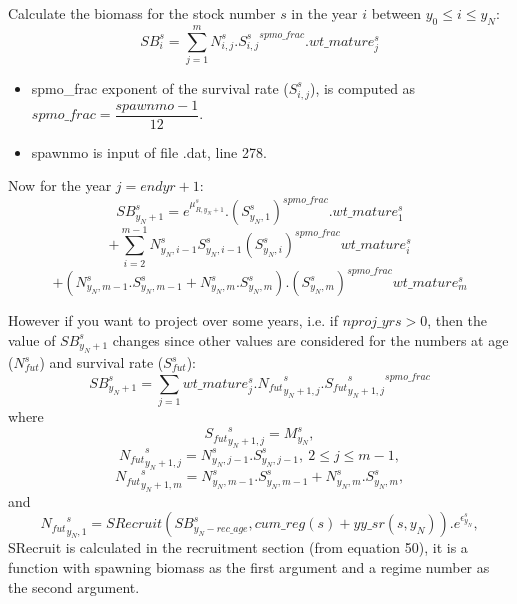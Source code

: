 \documentclass{article}
\begin{document}
Calculate the biomass for the stock number $s$ in the year $i$ between $y_0 \leq i \leq y_N$:
    \begin{equation}
    SB^s_i=\sum_{j=1}^{m}N^s_{i,j}.{S^s_{i,j}}^{spmo\_frac}.wt\_mature^s_j
\end{equation}
\begin{itemize}
    \item spmo\_frac exponent of the survival rate ($S^s_{i,j}$), is computed as 
    $spmo\_frac=\dfrac{spawnmo-1}{12}$.
    \item spawnmo is input of file .dat, line 278.
    
\end{itemize}
Now for the year $j=endyr+1$:
\begin{equation}
    SB^s_{y_N+1}=e^{\mu^s_{R,y_N+1}}.(S^{s}_{y_N,1})^{spmo\_frac
    }.wt\_mature^s_1
\end{equation}
\begin{equation*}
+\sum_{i=2}^{m-1}N^{s}_{y_N,i-1}S^{s}_{y_N,i-1}(S^s_{y_N,i})^{spmo\_frac}wt\_mature^s_i
\end{equation*}
\begin{equation*}
    +(N^{s}_{y_N,m-1}.S^s_{y_N,m-1}+N^s_{y_N,m}.S^s_{y_N,m}).(S^s_{y_N,m})^{spmo\_frac}wt\_mature^s_{m}
\end{equation*}

However if you want to project over some years, i.e. if $nproj\_yrs>0$, then the value of $SB^s_{y_N+1}$ changes since other values are considered for the numbers at age ($N^s_{fut}$) and survival rate ($S^s_{fut}$):
\begin{equation}
    SB^s_{y_N+1}= \sum_{j=1}wt\_mature^s_j.{N_{fut}}^s_{y_N+1,j}.{{S_{fut}}^s_{y_N+1,j}}^{spmo\_frac}
\end{equation}
where 
\begin{equation}
    {S_{fut}}^s_{y_N+1,j}=M^s_{y_N},
\end{equation}
\begin{equation}
    {N_{fut}}^s_{y_N+1,j}=N^s_{y_N,j-1}.S^s_{y_N,j-1}, \ 2\leq j \leq m-1,
\end{equation}
\begin{equation}
    {N_{fut}}^s_{y_N+1,m}=N^s_{y_N,m-1}.S^s_{y_N,m-1}+N^s_{y_N,m}.S^s_{y_N,m},
\end{equation}
and 
\begin{equation}
    {N_{fut}}^s_{y_N,1}=SRecruit(SB^s_{y_N-rec\_age},cum\_reg(s)+yy\_sr(s,y_N)).e^{\epsilon^s_{y_N}},
\end{equation}
SRecruit is calculated in the recruitment section (from equation 50), it is a function with spawning biomass as the first argument and a regime number as the second argument.
\end{document}

